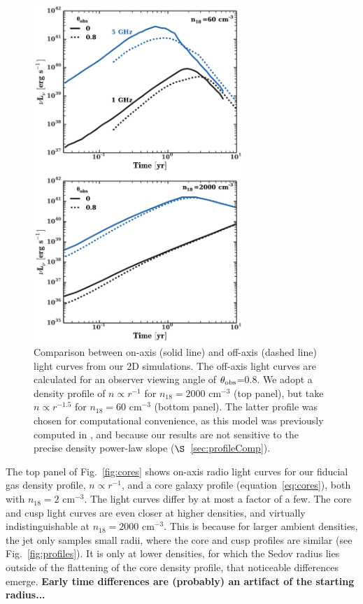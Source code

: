\documentclass[usenatbib,fleqn]{mnras}
\begin{document}
\begin{figure}
\includegraphics[width=8cm]{on_off.pdf}
\caption{\label{fig:onOff} Comparison between on-axis (solid line) and
  off-axis (dashed line) light curves from our 2D simulations.  The
  off-axis light curves are calculated for an observer viewing angle
  of $\theta_{\rm obs}$=0.8.  We adopt a density profile of $n\propto
  r^{-1}$ for $n_{18}=2000$ cm$^{-3}$ (top panel), but take $n\propto
  r^{-1.5}$ for $n_{18}=60$ cm$^{-3}$ (bottom panel).  The latter
  profile was chosen for computational convenience, as this model was
  previously computed in \citet{Mimica+2015}, and because our results
  are not sensitive to the precise density power-law slope
  ($\S$~\ref{sec:profileComp}).}
\end{figure}

\label{sec:profileComp}
The top panel of Fig.~\ref{fig:cores} shows on-axis radio light curves
for our fiducial gas density profile, $n\propto r^{-1}$, and a core
galaxy profile (equation~\ref{eq:cores}), both with $n_{18}=2$
cm$^{-3}$.  The light curves differ by at most a factor of a few. The
core and cusp light curves are even closer at higher densities, and
virtually indistinguishable at $n_{18}=2000$ cm$^{-3}$. This is
because for larger ambient densities, the jet only samples small
radii, where the core and cusp profiles are similar (see
Fig.~\ref{fig:profiles}). It is only at lower densities, for which the
Sedov radius lies outside of the flattening of the core density
profile, that noticeable differences emerge.  {\bf Early time
  differences are (probably) an artifact of the starting radius...}
\end{document}
